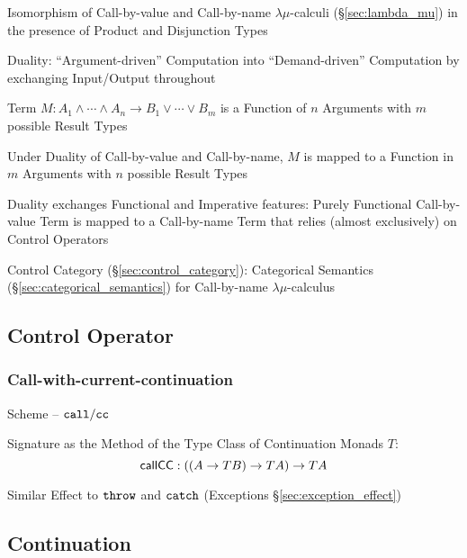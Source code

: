 Isomorphism of Call-by-value and Call-by-name $\lambda\mu$-calculi
(\S\ref{sec:lambda_mu}) in the presence of Product and Disjunction
Types

Duality: ``Argument-driven'' Computation into ``Demand-driven''
Computation by exchanging Input/Output throughout

Term $M : A_1 \wedge \cdots \wedge A_n \rightarrow B_1 \vee \cdots
\vee B_m$ is a Function of $n$ Arguments with $m$ possible Result
Types

Under Duality of Call-by-value and Call-by-name, $M$ is mapped to a
Function in $m$ Arguments with $n$ possible Result Types

Duality exchanges Functional and Imperative features: Purely
Functional Call-by-value Term is mapped to a Call-by-name Term that
relies (almost exclusively) on Control Operators %

Control Category (\S\ref{sec:control_category}): Categorical Semantics
(\S\ref{sec:categorical_semantics}) for Call-by-name
$\lambda\mu$-calculus



\subsection{Control Operator}\label{sec:control_operator}

\subsubsection{Call-with-current-continuation}\label{sec:callcc}

Scheme -- $\mathtt{call/cc}$

Signature as the Method of the Type Class of Continuation Monads $T$:
\[
  \mathsf{callCC} : ((A \rightarrow T B) \rightarrow T A) \rightarrow T A
\]

\fist Similar Effect to $\mathtt{throw}$ and $\mathtt{catch}$ (Exceptions
\S\ref{sec:exception_effect})



\subsection{Continuation}\label{sec:continuation}

